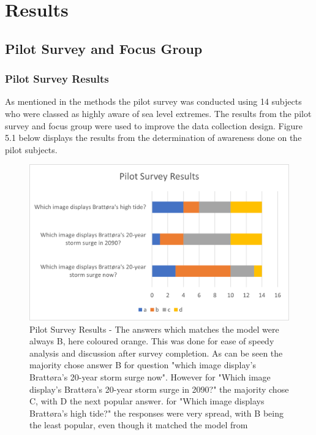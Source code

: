 \chapter{Results}

\section{Pilot Survey and Focus Group}

\subsection{Pilot Survey Results}
As mentioned in the methods the pilot survey was conducted using 14 subjects who were classed as highly aware of sea level extremes. The results from the pilot survey and focus group were used to improve the data collection design. Figure 5.1 below displays the results from the determination of awareness done on the pilot subjects.

\begin{figure}[h!]
    \centering
    \includegraphics{fig_results/pilot-survey-results.png}
    \caption{Pilot Survey Results - The answers which matches the model \cite{kartverket_se_2021} were always B, here coloured orange. This was done for ease of speedy analysis and discussion after survey completion.  As can be seen the majority chose answer B for question "which image display's Brattøra's 20-year storm surge now". However for "Which image display's Brattøra's 20-year storm surge in 2090?" the majority chose C, with D the next popular answer. for "Which image displays Brattøra's high tide?" the responses were very spread, with B being the least popular, even though it matched the model from \cite{kartverket_se_2021}    }
    \label{fig:pilot_survey_results}
\end{figure}


